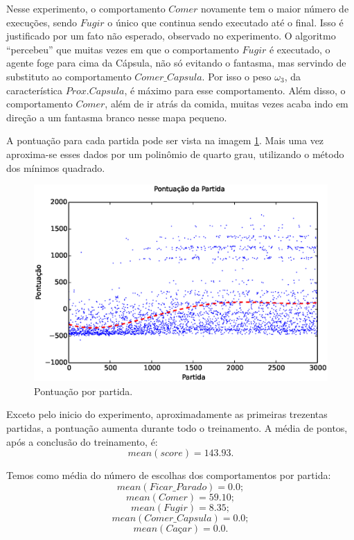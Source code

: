Nesse experimento, o comportamento $ Comer $ novamente tem o maior número de execuções, sendo $ Fugir $ o único que continua sendo executado até o final. Isso é justificado por um fato não esperado, observado no experimento. O algoritmo ``percebeu'' que muitas vezes em que o comportamento $ Fugir $ é executado, o agente foge para cima da Cápsula, não só evitando o fantasma, mas servindo de substituto ao comportamento $ Comer\_Capsula $. Por isso o peso $ \omega_3 $, da característica $ Prox. Capsula $, é máximo para esse comportamento. Além disso, o comportamento $ Comer $, além de ir atrás da comida, muitas vezes acaba indo em direção a um fantasma branco nesse mapa pequeno.

A pontuação para cada partida pode ser vista na imagem \ref{img:5ComportamentosMapaPequeno:PontuacaoPorPartida}. Mais uma vez aproxima-se esses dados por um polinômio de quarto grau, utilizando o método dos mínimos quadrado.

\begin{figure}[h]
    \centering
    \includegraphics[width=\linewidth]{images/5_behaviors_small_map/match_scores____pol}
    \caption{Pontuação por partida.}
    \label{img:5ComportamentosMapaPequeno:PontuacaoPorPartida}
\end{figure}

Exceto pelo inicio do experimento, aproximadamente as primeiras trezentas partidas, a pontuação aumenta durante todo o treinamento. A média de pontos, após a conclusão do treinamento, é:
$$ mean \left( score \right) = 143.93. $$

Temos como média do número de escolhas dos comportamentos por partida:
$$ mean \left( Ficar\_Parado \right) = 0.0; $$
$$ mean \left( Comer \right) = 59.10; $$
$$ mean \left( Fugir \right) = 8.35; $$
$$ mean \left( Comer\_Capsula \right) = 0.0; $$
$$ mean \left( \textit{Caçar} \right) = 0.0. $$


